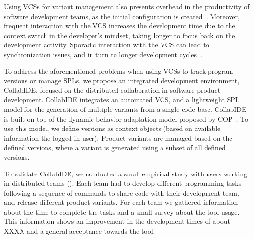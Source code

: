 Using \acp{VCS} for variant management also presents overhead in the productivity of software development teams, as the initial configuration is created~\cite{niu14}.
Moreover, frequent interaction with the \ac{VCS} increases the development time due to the context switch in the developer's mindset, taking longer to focus back on the development activity. Sporadic interaction with the \ac{VCS} can lead to synchronization issues, and in turn to longer development cycles~\cite{schwagerl15}.  

To address the aforementioned problems when using \acp{VCS} to track program versions or manage \acp{SPL}, we propose an integrated development environment, CollabIDE, focused on the distributed  collaboration in software product development. CollabIDE integrates an automated \ac{VCS}, and a lightweight \ac{SPL} model for the generation of multiple variants from a single code base. 
CollabIDE is built on top of the dynamic behavior adaptation model proposed by \ac{COP}~\cite{salvaneschi+12survey}. To use this model, we define versions as context objects (based on available information \eg the logged in user).
Product variants are managed based on the defined versions, where a variant is generated using a subset of all defined versions.

To validate CollabIDE, we conducted a small empirical study with users 
working in distributed teams (). Each team had to develop different programming tasks following a sequence of commands to share code with their development team, and release different product variants. For each team we gathered information about the time to complete the tasks and a small survey about the tool usage. This information shows an improvement in the development times of about XXXX and a general acceptance towards the tool.
 



\endinput

With CollabIDE, we aim to solve the overhead problems that exists in these development models with 
features that aim to reduce the time developers must spend doing actions related to version control or 
setting up a project that uses \acp{SPL}.
